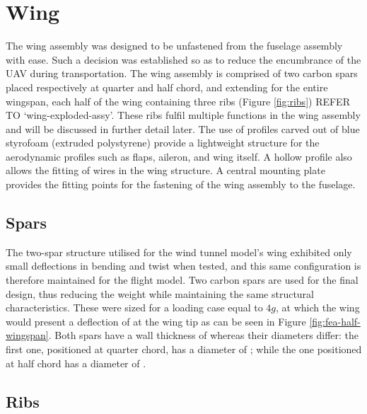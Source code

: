 \documentclass[../../main.tex]{subfiles}
\begin{document}

\section{Wing} \label{sec:final-design-proposal:wing}

The wing assembly was designed to be unfastened from the fuselage assembly with ease.
Such a decision was established so as to reduce the encumbrance of the UAV during transportation.
The wing assembly is comprised of two carbon spars placed respectively at quarter and half chord, and extending for the entire  wingspan, each half of the wing containing three ribs (Figure \ref{fig:ribs}) REFER TO `wing-exploded-assy'.
These ribs fulfil multiple functions in the wing assembly and will be discussed in further detail later.
The use of profiles carved out of blue styrofoam (extruded polystyrene) provide a lightweight structure for the aerodynamic profiles such as flaps, aileron, and wing itself.
A hollow profile also allows the fitting of wires in the wing structure.
A central mounting plate provides the fitting points for the fastening of the wing assembly to the fuselage.

\subsection{Spars} \label{sec:final-design-proposal:wing:spars}

The two-spar structure utilised for the wind tunnel model's wing exhibited only small deflections in bending and twist when tested, and this same configuration is therefore maintained for the flight model.
Two carbon spars are used for the final design, thus reducing the weight while maintaining the same structural characteristics.
These were sized for a loading case equal to $4g$, at which the wing would present a deflection of  at the wing tip as can be seen in Figure \ref{fig:fea-half-wingspan}.
Both spars have a wall thickness of  whereas their diameters differ: the first one, positioned at quarter chord, has a diameter of ; while the one positioned at half chord has a diameter of .


\subsection{Ribs} \label{sec:final-design-proposal:wing:ribs}
\end{document}
